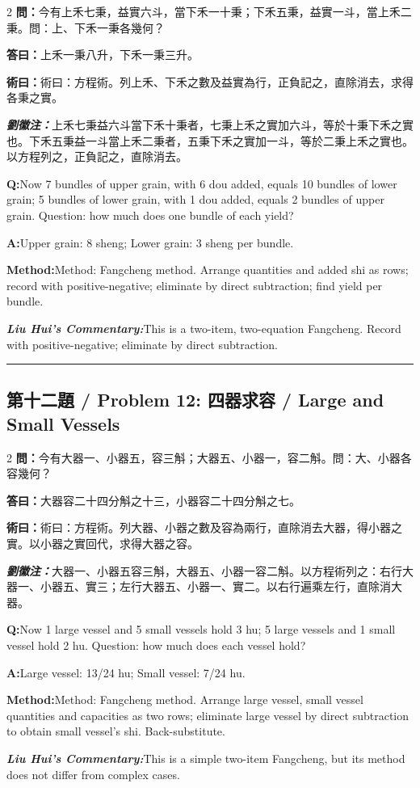 \documentclass[11pt,a4paper]{article}
\newcommand{\cnwen}{\textcolor{cnlabelfg}{\textbf{問：}}}
\newcommand{\cnda}{\textbf{答曰：}}
\newcommand{\cnshu}{\textcolor{cnlabelfg}{\textbf{術曰：}}}
\newcommand{\cnzhu}{\textcolor{commentarycolor}{\textit{\textbf{劉徽注：}}}}
\newcommand{\enwen}{\textcolor{enlabelfg}{\textbf{Q:}}}
\newcommand{\enda}{\textcolor{enlabelfg}{\textbf{A:}}}
\newcommand{\enshu}{\textcolor{enlabelfg}{\textbf{Method:}}}
\newcommand{\enzhu}{\textcolor{enlabelfg}{\textit{\textbf{Liu Hui's Commentary:}}}}
\begin{document}
\begin{paracol}{2}
\switchcolumn[0]
\cnwen 今有上禾七秉，益實六斗，當下禾一十秉；下禾五秉，益實一斗，當上禾二秉。問：上、下禾一秉各幾何？

\cnda 上禾一秉八升，下禾一秉三升。

\cnshu 術曰：方程術。列上禾、下禾之數及益實為行，正負記之，直除消去，求得各秉之實。

\cnzhu 上禾七秉益六斗當下禾十秉者，七秉上禾之實加六斗，等於十秉下禾之實也。下禾五秉益一斗當上禾二秉者，五秉下禾之實加一斗，等於二秉上禾之實也。以方程列之，正負記之，直除消去。

\switchcolumn[1]
\enwen Now 7 bundles of upper grain, with 6 dou added, equals 10 bundles of lower grain; 5 bundles of lower grain, with 1 dou added, equals 2 bundles of upper grain. Question: how much does one bundle of each yield?

\enda Upper grain: 8 sheng; Lower grain: 3 sheng per bundle.

\enshu Method: Fangcheng method. Arrange quantities and added shi as rows; record with positive-negative; eliminate by direct subtraction; find yield per bundle.

\enzhu This is a two-item, two-equation Fangcheng. Record with positive-negative; eliminate by direct subtraction.
\end{paracol}

\bigskip\hrule\bigskip

\subsection{第十二題 / Problem 12: 四器求容 / Large and Small Vessels}

\begin{paracol}{2}
\switchcolumn[0]
\cnwen 今有大器一、小器五，容三斛；大器五、小器一，容二斛。問：大、小器各容幾何？

\cnda 大器容二十四分斛之十三，小器容二十四分斛之七。

\cnshu 術曰：方程術。列大器、小器之數及容為兩行，直除消去大器，得小器之實。以小器之實回代，求得大器之容。

\cnzhu 大器一、小器五容三斛，大器五、小器一容二斛。以方程術列之：右行大器一、小器五、實三；左行大器五、小器一、實二。以右行遍乘左行，直除消大器。

\switchcolumn[1]
\enwen Now 1 large vessel and 5 small vessels hold 3 hu; 5 large vessels and 1 small vessel hold 2 hu. Question: how much does each vessel hold?

\enda Large vessel: 13/24 hu; Small vessel: 7/24 hu.

\enshu Method: Fangcheng method. Arrange large vessel, small vessel quantities and capacities as two rows; eliminate large vessel by direct subtraction to obtain small vessel's shi. Back-substitute.

\enzhu This is a simple two-item Fangcheng, but its method does not differ from complex cases.
\end{paracol}
\end{document}
